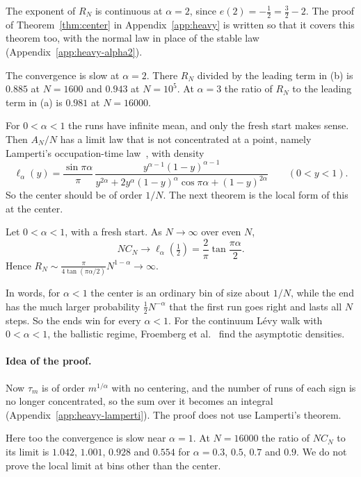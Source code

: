 The exponent of $R_N$ is continuous at $\alpha=2$, since
$e(2)=-\frac12=\frac32-2$. The proof of Theorem~\ref{thm:center} in
Appendix~\ref{app:heavy} is written so that it covers this theorem too, with
the normal law in place of the stable law
(Appendix~\ref{app:heavy-alpha2}).

The convergence is slow at $\alpha=2$. There $R_N$ divided by the leading
term in (b) is $0.885$ at $N=1600$ and $0.943$ at $N=10^5$. At $\alpha=3$
the ratio of $R_N$ to the leading term in (a) is $0.981$ at $N=16000$.

For $0<\alpha<1$ the runs have infinite mean, and only the fresh start makes
sense. Then $A_N/N$ has a limit law that is not concentrated at a point,
namely Lamperti's occupation-time
law~\cite{lamperti1958,godrecheluck2001}, with density
\[
 \ell_\alpha(y)=\frac{\sin\pi\alpha}{\pi}\,
 \frac{y^{\alpha-1}(1-y)^{\alpha-1}}{y^{2\alpha}+2y^\alpha(1-y)^\alpha
 \cos\pi\alpha+(1-y)^{2\alpha}}\qquad(0<y<1).
\]
So the center should be of order $1/N$. The next theorem is the local form
of this at the center.

\begin{theorem}[$0<\alpha<1$]\label{thm:lamperti}
Let $0<\alpha<1$, with a fresh start. As $N\to\infty$ over even $N$,
\[
 NC_N\to\ell_\alpha(\tfrac12)=\frac2\pi\tan\frac{\pi\alpha}2 .
\]
Hence $R_N\sim\frac{\pi}{4\tan(\pi\alpha/2)}N^{1-\alpha}\to\infty$.
\end{theorem}

In words, for $\alpha<1$ the center is an ordinary bin of size about $1/N$,
while the end has the much larger probability $\frac12N^{-\alpha}$ that the
first run goes right and lasts all $N$ steps. So the ends win for every $\alpha<1$.
For the continuum L\'evy walk with $0<\alpha<1$, the ballistic regime,
Froemberg et al.~\cite{fsbz2015} find the asymptotic densities.

\paragraph{Idea of the proof.}
Now $\tau_m$ is of order $m^{1/\alpha}$ with no centering, and the number of
runs of each sign is no longer concentrated, so the sum over it becomes an
integral (Appendix~\ref{app:heavy-lamperti}). The proof does not use
Lamperti's theorem.

Here too the convergence is slow near $\alpha=1$. At $N=16000$ the ratio of
$NC_N$ to its limit is $1.042$, $1.001$, $0.928$ and $0.554$ for
$\alpha=0.3$, $0.5$, $0.7$ and $0.9$. We do not prove the local limit at
bins other than the center.

